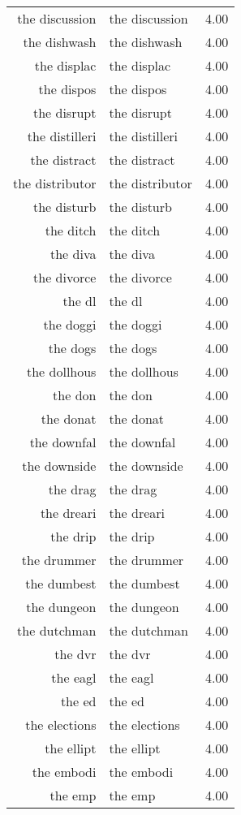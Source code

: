 \begin{table}[ht]
\begin{tabular}{rlr}
  the discussion & the discussion & 4.00 \\ 
  the dishwash & the dishwash & 4.00 \\ 
  the displac & the displac & 4.00 \\ 
  the dispos & the dispos & 4.00 \\ 
  the disrupt & the disrupt & 4.00 \\ 
  the distilleri & the distilleri & 4.00 \\ 
  the distract & the distract & 4.00 \\ 
  the distributor & the distributor & 4.00 \\ 
  the disturb & the disturb & 4.00 \\ 
  the ditch & the ditch & 4.00 \\ 
  the diva & the diva & 4.00 \\ 
  the divorce & the divorce & 4.00 \\ 
  the dl & the dl & 4.00 \\ 
  the doggi & the doggi & 4.00 \\ 
  the dogs & the dogs & 4.00 \\ 
  the dollhous & the dollhous & 4.00 \\ 
  the don & the don & 4.00 \\ 
  the donat & the donat & 4.00 \\ 
  the downfal & the downfal & 4.00 \\ 
  the downside & the downside & 4.00 \\ 
  the drag & the drag & 4.00 \\ 
  the dreari & the dreari & 4.00 \\ 
  the drip & the drip & 4.00 \\ 
  the drummer & the drummer & 4.00 \\ 
  the dumbest & the dumbest & 4.00 \\ 
  the dungeon & the dungeon & 4.00 \\ 
  the dutchman & the dutchman & 4.00 \\ 
  the dvr & the dvr & 4.00 \\ 
  the eagl & the eagl & 4.00 \\ 
  the ed & the ed & 4.00 \\ 
  the elections & the elections & 4.00 \\ 
  the ellipt & the ellipt & 4.00 \\ 
  the embodi & the embodi & 4.00 \\ 
  the emp & the emp & 4.00 \\ 

\end{tabular}
\end{table}
